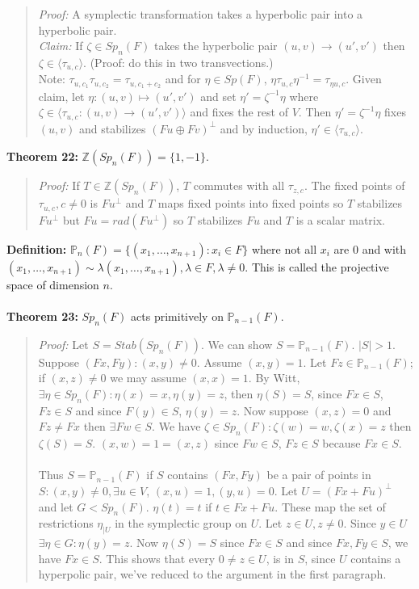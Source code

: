 \begin{quote}
\emph{Proof:}  
A symplectic transformation takes a hyperbolic pair into a hyperbolic pair.
\\
\emph{Claim:} If $\zeta \in Sp_n(F)$ takes the hyperbolic pair $(u,v) \rightarrow (u', v')$ then
$\zeta \in \langle \tau_{u,c} \rangle $. (Proof: do this in two transvections.)
\\
Note: $\tau_{u, c_1} \tau_{u,c_2} = \tau_{u, c_1 + c_2}$ and for
$\eta \in Sp(F)$, $\eta \tau_{u,c} \eta^{-1} = \tau_{\eta u,c}$.
Given claim, let $\eta: (u,v) \mapsto (u',v')$ and set
$\eta'= \zeta^{-1} \eta$ where $\zeta \in \langle \tau_{u,c}: (u,v) \rightarrow (u', v') \rangle$ and fixes
the rest of $V$.  Then $\eta'= \zeta^{-1} \eta$ 
fixes $(u,v)$ and stabilizes $(Fu \oplus Fv)^{\perp}$
and by induction, $\eta' \in \langle \tau_{u,c} \rangle $.
\end{quote}
{\bf Theorem 22:}
${\mathbb Z}(Sp_n(F))= \{ 1, -1 \}$.
\begin{quote}
\emph{Proof:}  
If 
$T \in {\mathbb Z}(Sp_n(F))$, $T$ commutes with all $\tau_{z,c}$.  The fixed points of
$\tau_{u,c}, c \ne 0$ is $Fu^{\perp}$ and $T$ maps fixed points into fixed points so
$T$ stabilizes $F u^{\perp}$ but $Fu= rad(F u^{\perp})$ so $T$ stabilizes $Fu$ and
$T$ is a scalar matrix.
\end{quote}
{\bf Definition:} ${\mathbb P}_{n}(F)= \{ (x_1, \ldots, x_{n+1}): x_i \in F\}$ where not all $x_i$ are $0$ and
with $(x_1, \ldots, x_{n+1}) \sim \lambda (x_1, \ldots, x_{n+1}), \lambda \in F, \lambda \neq 0$. This is called
the projective space of dimension $n$.
\\
\\
{\bf Theorem 23:}
$Sp_n(F)$ acts primitively on ${\mathbb P}_{n-1}(F)$.
\begin{quote}
\emph{Proof:}  
Let $S= Stab(Sp_n(F))$.  We can show $S= {\mathbb P}_{n-1}(F)$. $|S|>1$.  Suppose $(Fx, Fy): (x, y) \ne 0$.
Assume $(x, y) =1$.  Let $Fz \in {\mathbb P}_{n-1}(F)$; if $(x,z) \ne 0$ we may
assume $(x,x)=1$.  By Witt,
$\exists \eta \in Sp_n(F): \eta(x)= x, \eta(y)=z$,
then $\eta(S)= S$, since $Fx \in S$, $Fz \in S$ and since $F(y) \in S$, $\eta(y)= z$.
Now suppose $(x, z) = 0$ and $Fz \ne Fx$ then $\exists Fw \in S$.
We have $\zeta \in Sp_n(F): \zeta(w)= w, \zeta(x)=z$ then $\zeta(S)=S$. 
$(x,w)=1=(x,z)$ since
$Fw \in S$, $Fz \in S$ because $Fx \in S$.
\\
\\
Thus $S= {\mathbb P}_{n-1}(F)$ if $S$ contains $(Fx, Fy)$ be a pair of points in 
$S: (x,y) \ne 0, \exists u \in V$,
$(x,u) = 1, (y, u) = 0$.  Let $U= (Fx + Fu)^{\perp}$ and let $G < Sp_n(F)$.
$\eta(t)=t$ if $t \in Fx + Fu$.  These map the set of restrictions $\eta_{|U}$
in the symplectic group on $U$.  Let $z \in U, z \ne 0$.  Since $y \in U$
$\exists \eta \in G: \eta(y)=z$.  Now $\eta(S)=S$ since $Fx \in S$ and since
$Fx, Fy \in S$, we have $Fx \in S$.  This shows that every $0 \ne z \in U$,
is in $S$, since $U$ contains a hyperpolic pair, we've reduced to the argument in the first
paragraph.
\end{quote}
